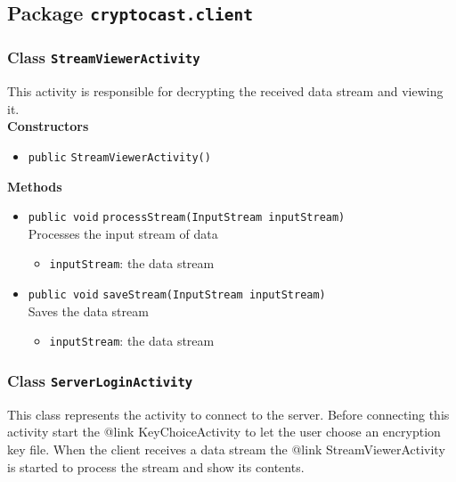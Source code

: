 \subsection{Package \lstinline!cryptocast.client!}
\subsubsection{Class \lstinline|StreamViewerActivity|}
This activity is responsible for decrypting the received data
 stream and viewing it. \\




\textbf{Constructors}
\begin{itemize}
\item \lstinline|public| \lstinline|StreamViewerActivity|\lstinline|()|




\end{itemize}


\textbf{Methods}
\begin{itemize}
\item \lstinline|public void| \lstinline|processStream|\lstinline|(InputStream inputStream)|\\
Processes the input stream of data
\begin{itemize}
\item \lstinline|inputStream|: the data stream
\end{itemize}



\item \lstinline|public void| \lstinline|saveStream|\lstinline|(InputStream inputStream)|\\
Saves the data stream
\begin{itemize}
\item \lstinline|inputStream|: the data stream
\end{itemize}



\end{itemize}

\subsubsection{Class \lstinline|ServerLoginActivity|}
This class represents the activity to connect to the server.
 Before connecting this activity start the {@link KeyChoiceActivity} to 
 let the user choose an encryption key file. When the client receives a 
 data stream the {@link StreamViewerActivity} is started to process the 
 stream and show its contents. \\


